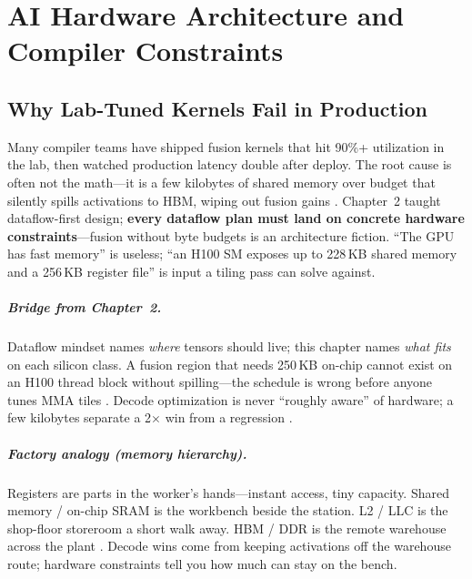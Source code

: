 \chapter{AI Hardware Architecture and Compiler Constraints}
\label{chap:ch03}

\section{Why Lab-Tuned Kernels Fail in Production}
\label{sec:industrial_hook}

Many compiler teams have shipped fusion kernels that hit 90\%+ utilization in the lab, then watched production latency double after deploy.
The root cause is often not the math---it is a few kilobytes of shared memory over budget that silently spills activations to HBM, wiping out fusion gains \citep{memoryfloor2026,nvidia2022hopper}.
Chapter~2 taught dataflow-first design; \textbf{every dataflow plan must land on concrete hardware constraints}---fusion without byte budgets is an architecture fiction.
``The GPU has fast memory'' is useless; ``an H100 SM exposes up to 228\,KB shared memory and a 256\,KB register file'' is input a tiling pass can solve against.

\paragraph{Bridge from Chapter~2.}
Dataflow mindset names \emph{where} tensors should live; this chapter names \emph{what fits} on each silicon class.
A fusion region that needs 250\,KB on-chip cannot exist on an H100 thread block without spilling---the schedule is wrong before anyone tunes MMA tiles \citep{yirage2026,chen2020compilerbasedhardw}.
Decode optimization is never ``roughly aware'' of hardware; a few kilobytes separate a 2$\times$ win from a regression \citep{taxbreak2026}.

\paragraph{Factory analogy (memory hierarchy).}
Registers are parts in the worker's hands---instant access, tiny capacity.
Shared memory / on-chip SRAM is the workbench beside the station.
L2 / LLC is the shop-floor storeroom a short walk away.
HBM / DDR is the remote warehouse across the plant \citep{dlbook,memoryfloor2026}.
Decode wins come from keeping activations off the warehouse route; hardware constraints tell you how much can stay on the bench.

